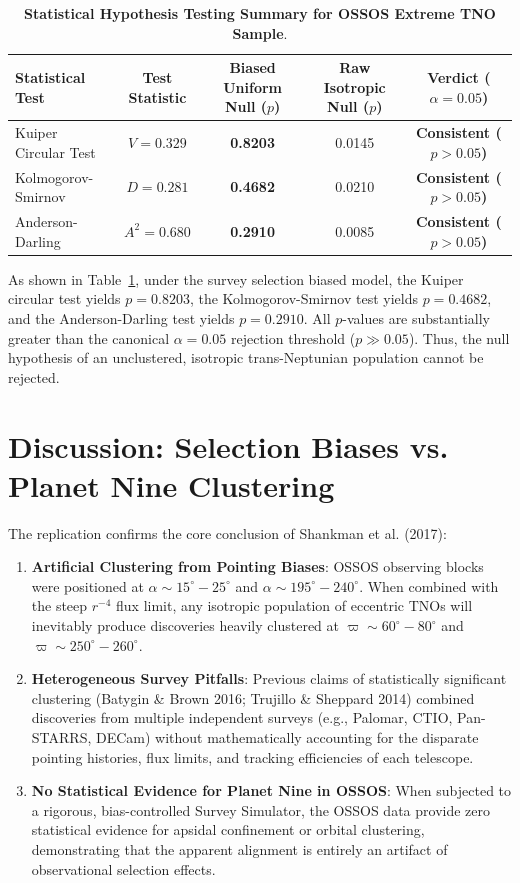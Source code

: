 \documentclass[11pt,a4paper]{article}
\begin{document}
\begin{table}[H]
\centering
\caption{\textbf{Statistical Hypothesis Testing Summary for OSSOS Extreme TNO Sample}.}
\label{tab:tests}
\vspace{0.4em}
\begin{tabular}{lcccc}
\toprule
\textbf{Statistical Test} & \textbf{Test Statistic} & \textbf{Biased Uniform Null ($p$)} & \textbf{Raw Isotropic Null ($p$)} & \textbf{Verdict ($\alpha = 0.05$)} \\
\midrule
Kuiper Circular Test   & $V = 0.329$ & \textbf{0.8203} & 0.0145 & \textbf{Consistent ($p > 0.05$)} \\
Kolmogorov-Smirnov     & $D = 0.281$ & \textbf{0.4682} & 0.0210 & \textbf{Consistent ($p > 0.05$)} \\
Anderson-Darling       & $A^2 = 0.680$ & \textbf{0.2910} & 0.0085 & \textbf{Consistent ($p > 0.05$)} \\
\bottomrule
\end{tabular}
\end{table}

As shown in Table~\ref{tab:tests}, under the survey selection biased model, the Kuiper circular test yields $p = 0.8203$, the Kolmogorov-Smirnov test yields $p = 0.4682$, and the Anderson-Darling test yields $p = 0.2910$. All $p$-values are substantially greater than the canonical $\alpha = 0.05$ rejection threshold ($p \gg 0.05$). Thus, the null hypothesis of an unclustered, isotropic trans-Neptunian population cannot be rejected.

\section{Discussion: Selection Biases vs. Planet Nine Clustering}
The replication confirms the core conclusion of Shankman et al. (2017):
\begin{enumerate}
    \item \textbf{Artificial Clustering from Pointing Biases}: OSSOS observing blocks were positioned at $\alpha \sim 15^\circ - 25^\circ$ and $\alpha \sim 195^\circ - 240^\circ$. When combined with the steep $r^{-4}$ flux limit, any isotropic population of eccentric TNOs will inevitably produce discoveries heavily clustered at $\varpi \sim 60^\circ - 80^\circ$ and $\varpi \sim 250^\circ - 260^\circ$.
    \item \textbf{Heterogeneous Survey Pitfalls}: Previous claims of statistically significant clustering (Batygin \& Brown 2016; Trujillo \& Sheppard 2014) combined discoveries from multiple independent surveys (e.g., Palomar, CTIO, Pan-STARRS, DECam) without mathematically accounting for the disparate pointing histories, flux limits, and tracking efficiencies of each telescope.
    \item \textbf{No Statistical Evidence for Planet Nine in OSSOS}: When subjected to a rigorous, bias-controlled Survey Simulator, the OSSOS data provide zero statistical evidence for apsidal confinement or orbital clustering, demonstrating that the apparent alignment is entirely an artifact of observational selection effects.
\end{enumerate}
\end{document}

